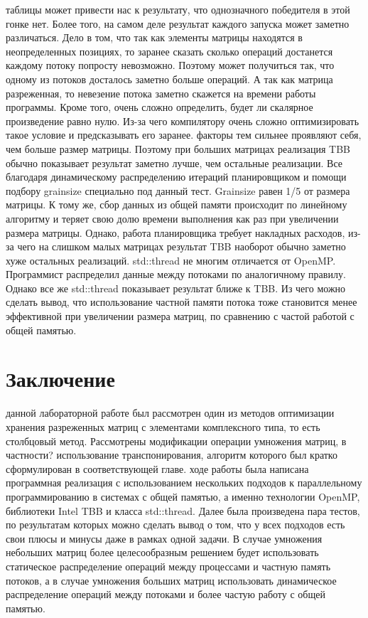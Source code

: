 \documentclass{report}
\begin{document}
 таблицы может привести нас к результату, что однозначного победителя в этой гонке нет. Более того, на самом деле результат каждого запуска может заметно различаться. Дело в том, что так как элементы матрицы находятся в неопределенных позициях, то заранее сказать сколько операций достанется каждому потоку попросту невозможно. Поэтому может получиться так, что одному из потоков досталось заметно больше операций. А так как матрица разреженная, то невезение потока заметно скажется на времени работы программы. Кроме того, очень сложно определить, будет ли скалярное произведение равно нулю. Из-за чего компилятору очень сложно оптимизировать такое условие и предсказывать его заранее.
 факторы тем сильнее проявляют себя, чем больше размер матрицы. Поэтому при больших матрицах реализация TBB обычно показывает результат заметно лучше, чем остальные реализации. Все благодаря динамическому распределению итераций планировщиком и помощи подбору grainsize специально под данный тест. Grainsize равен 1/5 от размера матрицы. К тому же, сбор данных из общей памяти происходит по линейному алгоритму и теряет свою долю времени выполнения как раз при увеличении размера матрицы. Однако, работа планировщика требует накладных расходов, из-за чего на слишком малых матрицах результат TBB наоборот обычно заметно хуже остальных реализаций.
 std::thread не многим отличается от OpenMP. Программист распределил данные между потоками по аналогичному правилу. Однако все же std::thread показывает результат ближе к TBB. Из чего можно сделать вывод, что использование частной памяти потока тоже становится менее эффективной при увеличении размера матриц, по сравнению с частой работой с общей памятью.

\newpage

\section*{Заключение}
 данной лабораторной работе был рассмотрен один из методов оптимизации хранения разреженных матриц с элементами комплексного типа, то есть столбцовый метод. Рассмотрены модификации операции умножения матриц, в частности? использование транспонирования, алгоритм которого был кратко сформулирован в соответствующей главе.
 ходе работы была написана программная реализация с использованием нескольких подходов к параллельному программированию в системах с общей памятью, а именно технологии OpenMP, библиотеки Intel TBB и класса std::thread. Далее была произведена пара тестов, по результатам которых можно сделать вывод о том, что у всех подходов есть свои плюсы и минусы даже в рамках одной задачи. В случае умножения небольших матриц более целесообразным решением будет использовать статическое распределение операций между процессами и частную память потоков, а в случае умножения больших матриц использовать динамическое распределение операций между потоками и более частую работу с общей памятью.
\end{document}
